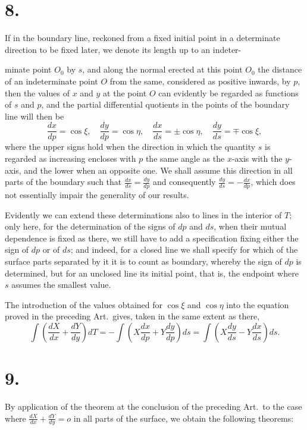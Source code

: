 \documentclass{article}
\begin{document}
\section*{8.}

If in the boundary line, reckoned from a fixed initial point in a determinate direction to be fixed later, we denote its length up to an indeter-

minate point $O_0$ by $s$, and along the normal erected at this point $O_0$ the distance of an indeterminate point $O$ from the same, considered as positive inwards, by $p$, then the values of $x$ and $y$ at the point $O$ can evidently be regarded as functions of $s$ and $p$, and the partial differential quotients in the points of the boundary line will then be
\[
\frac{dx}{dp} = \cos\xi, \quad \frac{dy}{dp} = \cos\eta, \quad \frac{dx}{ds} = \pm\cos\eta, \quad \frac{dy}{ds} = \mp\cos\xi,
\]
where the upper signs hold when the direction in which the quantity $s$ is regarded as increasing encloses with $p$ the same angle as the $x$-axis with the $y$-axis, and the lower when an opposite one. We shall assume this direction in all parts of the boundary such that $\frac{dx}{ds} = \frac{dy}{dp}$ and consequently $\frac{dy}{ds} = -\frac{dx}{dp}$, which does not essentially impair the generality of our results.

Evidently we can extend these determinations also to lines in the interior of $T$; only here, for the determination of the signs of $dp$ and $ds$, when their mutual dependence is fixed as there, we still have to add a specification fixing either the sign of $dp$ or of $ds$; and indeed, for a closed line we shall specify for which of the surface parts separated by it it is to count as boundary, whereby the sign of $dp$ is determined, but for an unclosed line its initial point, that is, the endpoint where $s$ assumes the smallest value.

The introduction of the values obtained for $\cos\xi$ and $\cos\eta$ into the equation proved in the preceding Art.\ gives, taken in the same extent as there,
\[
\int \left(\frac{dX}{dx} + \frac{dY}{dy}\right) dT = -\int \left(X\frac{dx}{dp} + Y\frac{dy}{dp}\right) ds = \int \left(X\frac{dy}{ds} - Y\frac{dx}{ds}\right) ds.
\]

\section*{9.}

By application of the theorem at the conclusion of the preceding Art.\ to the case where $\frac{dX}{dx} + \frac{dY}{dy} = o$ in all parts of the surface, we obtain the following theorems:
\end{document}

